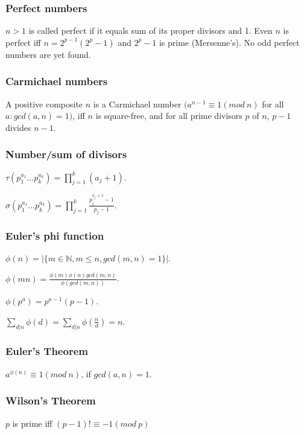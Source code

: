 \documentclass[a4paper,13pt]{article}
\begin{document}
\subsubsection{Perfect numbers}
$n > 1$ is called perfect if it equals sum of its proper divisors and 1. Even $n$ is perfect iff $n = 2^{p-1}(2^{p} - 1)$ and $2^{p} - 1$ is prime (Mersenne’s). No odd perfect numbers are yet found.

\subsubsection{Carmichael numbers}
A positive composite $n$ is a Carmichael number $(a^{n-1} \equiv 1 (mod\ n)$ for all $a: gcd(a,n) = 1)$, iff $n$ is square-free, and for all prime divisors $p$ of $n$, $p-1$ divides $n-1$.

\subsubsection{Number/sum of divisors}
$\tau(p_1^{a_1}...p_k^{a_k}) = \prod_{j=1}^{k}(a_j + 1).$

$\sigma(p_1^{a_1}...p_k^{a_k}) = \prod_{j=1}^{k}\frac{p_{j}^{a_j+1}-1}{p_j-1}.$

\subsubsection{Euler's phi function}

$\phi(n) = |\{m \in \mathbb{N}, m \leq n, gcd(m,n) = 1\}|$.

$\phi(mn) = \frac{\phi(m)\phi(n)gcd(m,n)}{\phi(gcd(m,n))}$.

$\phi(p^a) = p^{a-1}(p-1)$.

$\sum_{d|n}\phi(d) = \sum_{d|n}\phi(\frac{n}{d}) = n$.

\subsubsection{Euler's Theorem} 
$a^{\phi(n)} \equiv 1 (mod\ n)$, if $gcd(a,n) = 1$.

\subsubsection{Wilson's Theorem} 
$p$ is prime iff $(p-1)! \equiv -1 (mod\ p)$
\end{document}
